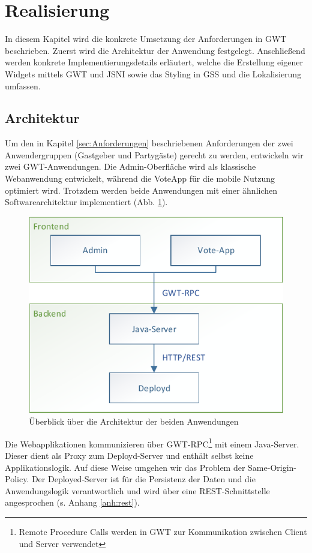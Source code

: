 \section{Realisierung}

In diesem Kapitel wird die konkrete Umsetzung der Anforderungen in GWT beschrieben.
Zuerst wird die Architektur der Anwendung festgelegt. Anschließend werden konkrete
Implementierungsdetails erläutert, welche die Erstellung eigener Widgets mittels GWT und
JSNI sowie das Styling in GSS und die Lokalisierung umfassen.

\subsection{Architektur}
Um den in Kapitel \ref{sec:Anforderungen} beschriebenen Anforderungen der zwei Anwendergruppen (Gastgeber und Partygäste) gerecht zu werden, entwickeln wir zwei GWT-Anwendungen. Die Admin-Oberfläche wird als klassische Webanwendung
entwickelt, während die VoteApp für die mobile Nutzung optimiert wird. Trotzdem werden beide Anwendungen mit einer ähnlichen Softwarearchitektur implementiert (Abb. \ref{fig:Architektur-Ueberblick}).

\begin{figure}[tbh]
\centering
\includegraphics[width=0.7\linewidth]{Bilder/Architektur-Ueberblick}
\caption{Überblick über die Architektur der beiden Anwendungen}
\label{fig:Architektur-Ueberblick}
\end{figure}

Die Webapplikationen kommunizieren über GWT-RPC\footnote{Remote Procedure Calls werden in GWT zur Kommunikation zwischen Client und Server verwendet} mit einem Java-Server. Dieser dient als 
Proxy zum Deployd-Server und enthält selbst keine Applikationslogik. Auf diese Weise umgehen wir das Problem der Same-Origin-Policy. Der Deployed-Server ist für die Persistenz der Daten und die Anwendungslogik verantwortlich und wird über eine REST-Schnittstelle angesprochen (s. Anhang \ref{anh:rest}).

